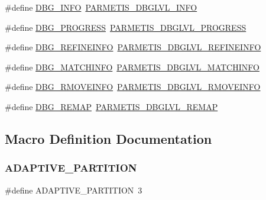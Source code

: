 \begin{DoxyCompactItemize}
$$\#define \hyperlink{a00894_a9615e001b781d55752b3d44f9bfd5162}{D\+B\+G\+\_\+\+I\+N\+FO}~\hyperlink{a00843_ad4d113bb626ca386dfbb86d6730c9d0d}{P\+A\+R\+M\+E\+T\+I\+S\+\_\+\+D\+B\+G\+L\+V\+L\+\_\+\+I\+N\+FO}
\item 
\#define \hyperlink{a00894_a434d33350a7d7626f74ad405657f2306}{D\+B\+G\+\_\+\+P\+R\+O\+G\+R\+E\+SS}~\hyperlink{a00843_a6913cca439f729f0d831646979505f71}{P\+A\+R\+M\+E\+T\+I\+S\+\_\+\+D\+B\+G\+L\+V\+L\+\_\+\+P\+R\+O\+G\+R\+E\+SS}
\item 
\#define \hyperlink{a00894_a1f8b86f5b722c351ccbe561a4adfcef4}{D\+B\+G\+\_\+\+R\+E\+F\+I\+N\+E\+I\+N\+FO}~\hyperlink{a00843_a483143525f038b8d1cc9876e104b2228}{P\+A\+R\+M\+E\+T\+I\+S\+\_\+\+D\+B\+G\+L\+V\+L\+\_\+\+R\+E\+F\+I\+N\+E\+I\+N\+FO}
\item 
\#define \hyperlink{a00894_ad667777c9f945ac4dcc7ec649b49caa5}{D\+B\+G\+\_\+\+M\+A\+T\+C\+H\+I\+N\+FO}~\hyperlink{a00843_a2c17217243390b94295386f8cb1f853d}{P\+A\+R\+M\+E\+T\+I\+S\+\_\+\+D\+B\+G\+L\+V\+L\+\_\+\+M\+A\+T\+C\+H\+I\+N\+FO}
\item 
\#define \hyperlink{a00894_a8a22b5876e0e1619e9d757376bfdf284}{D\+B\+G\+\_\+\+R\+M\+O\+V\+E\+I\+N\+FO}~\hyperlink{a00843_aff381af99e792c5a07a391f18bc1a6ea}{P\+A\+R\+M\+E\+T\+I\+S\+\_\+\+D\+B\+G\+L\+V\+L\+\_\+\+R\+M\+O\+V\+E\+I\+N\+FO}
\item 
\#define \hyperlink{a00894_a4126e11965bcb4ba404b5d7975514b42}{D\+B\+G\+\_\+\+R\+E\+M\+AP}~\hyperlink{a00843_a38aa880d4f8c0dbda1800f21f606a1e1}{P\+A\+R\+M\+E\+T\+I\+S\+\_\+\+D\+B\+G\+L\+V\+L\+\_\+\+R\+E\+M\+AP}
\end{DoxyCompactItemize}


\subsection{Macro Definition Documentation}
\mbox{\label{a00894_a0ce405c623e3960361d7dc982e4db789}} 
\subsubsection{\texorpdfstring{A\+D\+A\+P\+T\+I\+V\+E\+\_\+\+P\+A\+R\+T\+I\+T\+I\+ON}{ADAPTIVE\_PARTITION}}
{\footnotesize\ttfamily \#define A\+D\+A\+P\+T\+I\+V\+E\+\_\+\+P\+A\+R\+T\+I\+T\+I\+ON~3}

